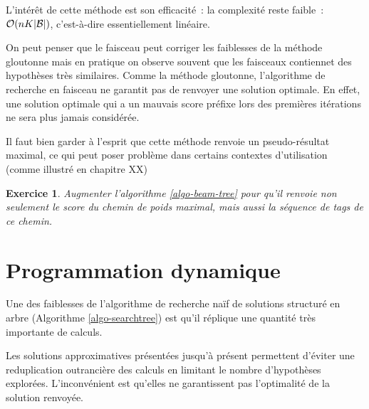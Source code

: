 \documentclass[11pt,openany]{book}
\newtheorem{exo}{Exercice}[chapter]
\begin{document}
L'intérêt de cette méthode est son efficacité~: la complexité reste faible~:
${\cal O}(n K |\mathcal{B}|)$, c'est-à-dire essentiellement linéaire.

On peut penser que le faisceau peut corriger les faiblesses de la méthode
gloutonne mais en pratique on observe souvent que les faisceaux
contiennet des hypothèses très similaires.
Comme la méthode gloutonne, l'algorithme de recherche en faisceau ne
garantit pas de renvoyer une solution optimale. 
En effet, une solution optimale qui a un mauvais score préfixe lors
des premières itérations ne sera plus jamais considérée. 

Il faut bien garder à l'esprit que cette méthode renvoie un
pseudo-résultat maximal, ce qui peut poser problème
 dans certains contextes d'utilisation (comme illustré en chapitre XX)

\begin{exo}
Augmenter l'algorithme \ref{algo-beam-tree} pour qu'il renvoie
non seulement le score du chemin de poids maximal, mais aussi
la séquence de tags de ce chemin.
\end{exo}


\section{Programmation dynamique}
\label{sec-DP}

Une des faiblesses de l'algorithme de recherche naïf de solutions
structuré en arbre (Algorithme \ref{algo-searchtree})  est qu'il
réplique une quantité très importante de calculs. 

Les solutions approximatives présentées jusqu'à présent
permettent d'éviter une reduplication outrancière des calculs
en limitant le nombre d'hypothèses explorées.
L'inconvénient est qu'elles ne garantissent pas l'optimalité de la
solution renvoyée. 
\end{document}
